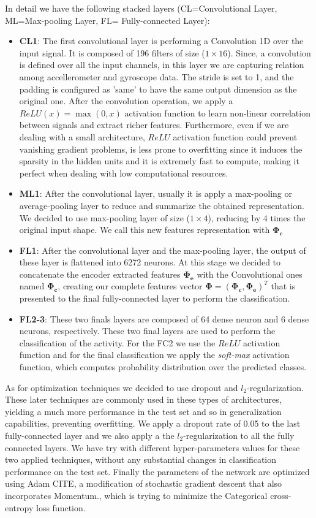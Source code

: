 In detail we have the following stacked layers (CL=Convolutional Layer, ML=Max-pooling Layer, FL= Fully-connected Layer):
\begin{itemize}
	\item \textbf{CL1}: The first convolutional layer is performing a Convolution 1D over the input signal. It is composed of 196 filters of size ($1\times16$). Since, a convolution is defined over all the input channels, in this layer we are capturing relation among accellerometer and gyroscope data. The stride is set to 1, and the padding is configured as 'same' to have the same output dimension as the original one. After the convolution operation, we apply a $ReLU(x)=\max(0,x)$ activation function to learn non-linear correlation between signals and extract richer features. Furthermore, even if we are dealing with a small architecture, $ReLU$ activation function could prevent vanishing gradient problems, is less prone to overfitting since it induces the sparsity in the hidden units and it is extremely fast to compute, making it perfect when dealing with low computational resources.
	\item \textbf{ML1}: After the convolutional layer, usually it is apply a max-pooling or average-pooling layer to reduce and summarize the obtained representation. We decided to use max-pooling layer of size ($1\times4$), reducing by 4 times the original input shape. We call this new features representation with $ \boldsymbol{\Phi_{\text{c}} }$
	\item \textbf{FL1}: After the convolutional layer and the max-pooling layer, the output of these layer is flattened into 6272 neurons. At this stage we decided to concatenate the encoder extracted features $ \boldsymbol{\Phi_{\text{e}}} $ with the Convolutional ones named $\boldsymbol{\Phi_{\text{c}}}$, creating our complete features vector $\boldsymbol{\Phi} = (\boldsymbol{\Phi_{\text{c}}}, \boldsymbol{\Phi_{\text{e}}})^T$ that is presented to the final fully-connected layer to perform the classification.
	\item \textbf{FL2-3}: These two finals layers are composed of 64 dense neuron and 6 dense neurons, respectively. These two final layers are used to perform the classification of the activity. For the FC2 we use the $ReLU$ activation function and for the final classification we apply the \textit{soft-max} activation function, which computes probability distribution over the predicted classes.
\end{itemize}

As for optimization techniques we decided to use dropout and $l_2$-regularization. These later techniques are commonly used in these types of architectures, yielding a much more performance in the test set and so in generalization capabilities, preventing overfitting. We apply a dropout rate of 0.05 to the last fully-connected layer and we also apply a the $l_2$-regularization to all the fully connected layers. We have try with different hyper-parameters values for these two applied techniques, without any substantial changes in classification performance on the test set. Finally the parameters of the network are optimized using Adam CITE, a modification of stochastic gradient descent that also incorporates Momentum., which is trying to minimize the Categorical cross-entropy loss function.
